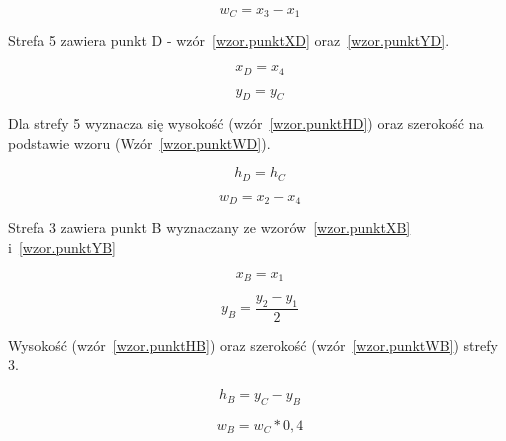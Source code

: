 \documentclass[a4paper,twoside,12pt]{book}
\begin{document}
    \large
    \begin{equation}
        w_{C}= x_{3} - x_{1}
        \label{wzor.punktWC}
    \end{equation}
    \normalsize

    Strefa 5 zawiera punkt D - wzór~\ref{wzor.punktXD} oraz~\ref{wzor.punktYD}.

    \large
    \begin{equation}
        x_{D}=x_{4}
        \label{wzor.punktXD}
    \end{equation}
    \normalsize

    \large
    \begin{equation}
        y_{D}= y_{C}
        \label{wzor.punktYD}
    \end{equation}
    \normalsize

    Dla strefy 5 wyznacza się wysokość (wzór~\ref{wzor.punktHD}) oraz
    szerokość na podstawie wzoru (Wzór~\ref{wzor.punktWD}).

    \large
    \begin{equation}
        h_{D}=h_{C}
        \label{wzor.punktHD}
    \end{equation}
    \normalsize

    \large
    \begin{equation}
        w_{D}= x_{2} - x_{4}
        \label{wzor.punktWD}
    \end{equation}
    \normalsize

    Strefa 3 zawiera punkt B wyznaczany ze wzorów~\ref{wzor.punktXB} i~\ref{wzor.punktYB}

    \large
    \begin{equation}
        x_{B}=x_{1}
        \label{wzor.punktXB}
    \end{equation}
    \normalsize

    \large
    \begin{equation}
        y_{B}= \frac{y_{2} - y_{1}}{2}
        \label{wzor.punktYB}
    \end{equation}
    \normalsize

    Wysokość (wzór~\ref{wzor.punktHB}) oraz szerokość (wzór~\ref{wzor.punktWB}) strefy 3.

    \large
    \begin{equation}
        h_{B}=y_{C} - y_{B}
        \label{wzor.punktHB}
    \end{equation}
    \normalsize

    \large
    \begin{equation}
        w_{B}= w_{C} * 0,4
        \label{wzor.punktWB}
    \end{equation}
    \normalsize
\end{document}
